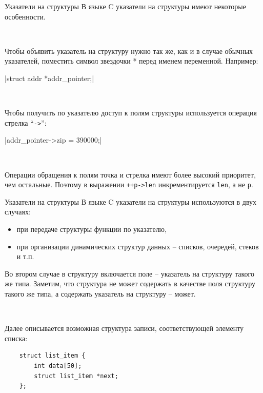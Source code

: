 \documentclass{beamer}
\begin{document}
\begin{frame}{Указатели на структуры}
    В языке C указатели на структуры имеют некоторые особенности.
    
    ~
    
    Чтобы объявить указатель на структуру нужно так же, как и в случае обычных указателей, поместить символ звездочки * перед именем переменной. Например:
    
    |struct addr *addr_pointer;|
    
    ~
    
    Чтобы получить по указателю доступ к полям структуры используется
    операция стрелка “\texttt{->}”:
    
    |addr_pointer->zip = 390000;|
    
    ~
    
    Операции обращения к полям точка и стрелка имеют более высокий
    приоритет, чем остальные. Поэтому в выражении \texttt{++p->len}
    инкрементируется \texttt{len}, а не \texttt{p}.
\end{frame}

\begin{frame}[fragile]{Указатели на структуры}
    В языке C указатели на структуры используются в двух случаях:
    \begin{itemize}
    \item при передаче структуры функции по указателю,
    \item при организации динамических структур данных – списков, очередей, стеков и т.п.
    \end{itemize}
    
    Во втором случае в структуру включается поле – указатель на структуру такого же типа. Заметим, что структура не может содержать в качестве поля структуру такого же типа, а содержать указатель на структуру – может.
    
    ~
    
    Далее описывается возможная структура записи, соответствующей элементу списка:
    
    \begin{verbatim}
    struct list_item {
        int data[50];
        struct list_item *next;
    };
    \end{verbatim}
\end{frame}
\end{document}
